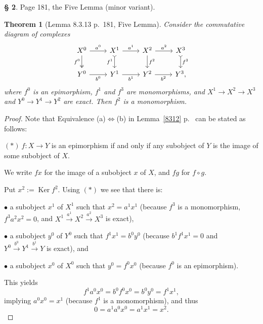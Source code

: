 \documentclass[12pt]{article}
\newtheorem{thm}{Theorem}
\theoremstyle{remark}
\theoremstyle{definition}
\newtheorem{s}[thm]{\S}
\newcommand{\bu}{\bullet}
\newcommand{\nn}{\noindent}
\newcommand{\ssi}{\Leftrightarrow}
\newcommand{\xr}{\xrightarrow}
\DeclareMathOperator{\Ker}{Ker}
\begin{document}
\begin{s} 
Page 181, the Five Lemma (minor variant). 

\begin{thm}[Lemma 8.3.13 p.~181, Five Lemma] 
Consider the commutative diagram of complexes 
$$
\begin{tikzcd}
X^0\arrow[two heads]{d}[swap]{f^0}\arrow{r}{a^0}&
X^1\arrow[tail]{d}[swap]{f^1}\arrow{r}{a^1}&
X^2\arrow{d}{f^2}\arrow{r}{a^2}&
X^3\arrow[tail]{d}{f^3}\\ 
Y^0\arrow{r}[swap]{b^0}&
Y^1\arrow{r}[swap]{b^1}&
Y^2\arrow{r}[swap]{b^2}&
Y^3,
\end{tikzcd}
$$
where $f^0$ is an epimorphism, $f^1$ and $f^3$ are monomorphisms, and $X^1\to X^2\to X^3$ and $Y^0\to Y^1\to Y^2$ are exact. Then $f^2$ is a monomorphism. 
\end{thm} 

\begin{proof}
Note that Equivalence (a)$\ssi$(b) in Lemma~\ref{8312} p.~\pageref{8312} can be stated as follows: 

\nn$(*)\ f:X\to Y$ is an epimorphism if and only if any subobject of $Y$ is the image of some subobject of $X$. 

We write $fx$ for the image of a subobject $x$ of $X$, and $fg$ for $f\circ g$.

Put $x^2:=\Ker f^2$. Using $(*)$ we see that there is: 

\nn$\bu$ a subobject $x^1$ of $X^1$ such that $x^2=a^1x^1$ (because $f^3$ is a monomorphism, $f^3a^2x^2=0$, and $X^1\xr{a^1}X^2\xr{a^2}X^3$ is exact), 

\nn$\bu$ a subobject $y^0$ of $Y^0$ such that $f^1x^1=b^0y^0$ (because $b^1f^1x^1=0$ and $Y^0\xr{b^0}Y^1\xr{b^1}Y$ is exact), and 

\nn$\bu$ a subobject $x^0$ of $X^0$ such that $y^0=f^0x^0$ (because $f^0$ is an epimorphism). 

This yields 
$$
f^1a^0x^0=b^0f^0x^0=b^0y^0=f^1x^1,
$$
implying $a^0x^0=x^1$ (because $f^1$ is a monomorphism), and thus 
$$
0=a^1a^0x^0=a^1x^1=x^2.
$$ 
\end{proof}
\end{s}

%
\end{document}
